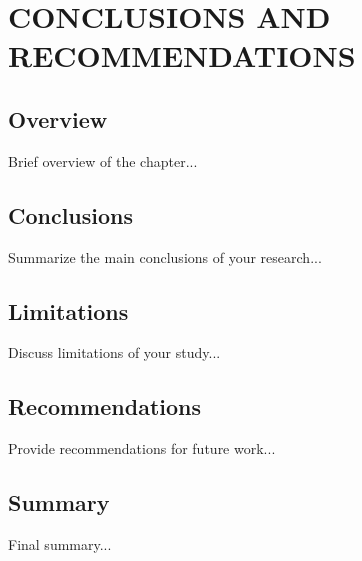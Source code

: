 
\chapter{CONCLUSIONS AND RECOMMENDATIONS}

\ifpdf
    \graphicspath{{conclusion/figures/PNG}{conclusion/figures/PDF}{conclusion/figures}}
\else
    \graphicspath{{conclusion/figures/EPS}{conclusion/figures}}
\fi

\section{Overview}
Brief overview of the chapter...

\section{Conclusions}
Summarize the main conclusions of your research...

\section{Limitations}
Discuss limitations of your study...

\section{Recommendations}
Provide recommendations for future work...

\section{Summary}
Final summary...
